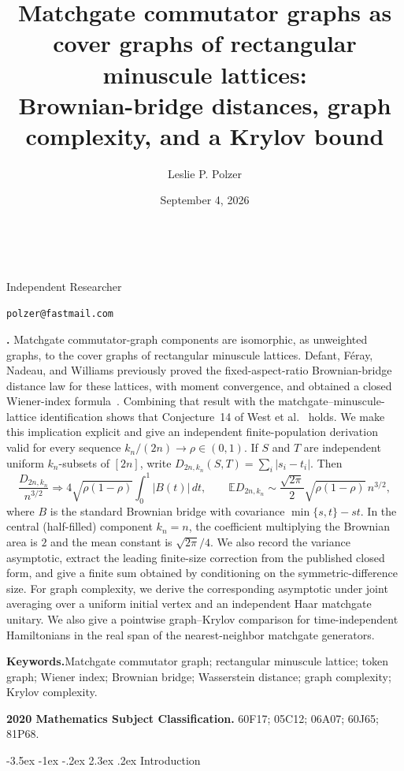 \documentclass[twoside,10pt]{article}
\title{Matchgate commutator graphs as cover graphs of rectangular minuscule lattices:\\
Brownian-bridge distances, graph complexity, and a Krylov bound}
\author{Leslie P. Polzer}
\date{September 4, 2026}
\makeatletter
\numberwithin{equation}{section}
\theoremstyle{slbody}
\theoremstyle{definition}
\theoremstyle{remark}
\newcommand{\E}{\mathbb{E}}
\newcommand{\1}{\mathbf{1}}
\newcommand{\authoraffiliation}{Independent Researcher}
\newcommand{\authoremail}{polzer@fastmail.com}
\renewcommand{\section}{%
  \@startsection{section}{1}{\z@}%
    {-3.5ex \@plus -1ex \@minus -.2ex}%
    {2.3ex \@plus .2ex}%
    {\normalfont\large\bfseries}}
\renewcommand{\maketitle}{%
  \begin{center}
    {\large\bfseries\@title}\\
    \vskip36pt
    \ifx\@author\@empty
      \mbox{}\par
    \else
      {\scshape\@author}\par
      \medskip
      {\small\authoraffiliation}\par
      \smallskip
      {\small\texttt{\authoremail}}\par
      \smallskip
      {\small\@date}\par
    \fi
    \vskip36pt
  \end{center}}
\renewenvironment{abstract}
  {\quotation\noindent\small{\bfseries\abstractname.\enspace}}
  {\endquotation}
\makeatother
\begin{document}
\raggedbottom
\maketitle

\begin{abstract}
Matchgate commutator-graph components are isomorphic, as unweighted graphs, to
the cover graphs of rectangular minuscule lattices.  Defant, F\'eray, Nadeau,
and Williams previously proved
the fixed-aspect-ratio Brownian-bridge distance law for these lattices, with
moment convergence, and obtained a closed Wiener-index
formula~\cite{DefantEtAl}.  Combining that result with the
matchgate--minuscule-lattice identification shows that Conjecture~14 of West
et al.~\cite[Conjecture~14]{WestEtAl} holds.  We make this implication
explicit and give an independent finite-population derivation valid for every
sequence $k_n/(2n)\to\rho\in(0,1)$.
If $S$ and $T$ are independent uniform $k_n$-subsets of
$[2n]$, write
$D_{2n,k_n}(S,T)=\sum_i|s_i-t_i|$.  Then
\[
 \frac{D_{2n,k_n}}{n^{3/2}}
 \Rightarrow 4\sqrt{\rho(1-\rho)}\int_0^1|B(t)|\,dt,
 \qquad
 \E D_{2n,k_n}\sim
 \frac{\sqrt{2\pi}}2\sqrt{\rho(1-\rho)}\,n^{3/2},
\]
where $B$ is the standard Brownian bridge with covariance
$\min\{s,t\}-st$.  In the central (half-filled) component $k_n=n$, the
coefficient multiplying the Brownian area is $2$ and the mean constant is
$\sqrt{2\pi}/4$.  We also record the variance asymptotic, extract the leading
finite-size correction from the published closed form, and give a finite sum
obtained by conditioning on the symmetric-difference size.  For graph
complexity, we derive the corresponding asymptotic under joint averaging over
a uniform initial vertex and an independent Haar matchgate unitary.  We also
give a pointwise graph--Krylov comparison for time-independent Hamiltonians in
the real span of the nearest-neighbor matchgate generators.

\vskip5pt
\noindent\textbf{Keywords.}\enspace Matchgate commutator graph; rectangular
minuscule lattice; token graph; Wiener index; Brownian bridge; Wasserstein
distance; graph complexity; Krylov complexity.

\vskip5pt
\noindent\textbf{2020 Mathematics Subject Classification.}\enspace
60F17; 05C12; 06A07; 60J65; 81P68.
\end{abstract}

\vskip50pt
\baselineskip=13.5pt

\section{Introduction}
\end{document}
